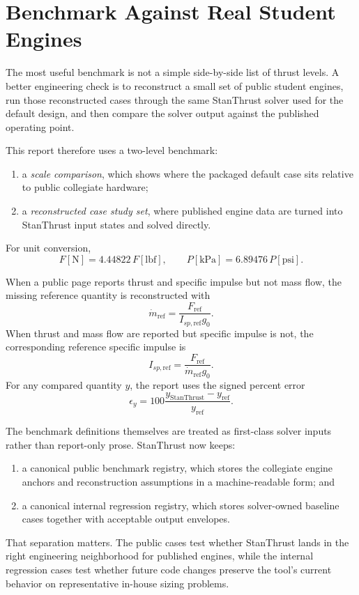\documentclass[11pt]{article}
\begin{document}
\section{Benchmark Against Real Student Engines}
The most useful benchmark is not a simple side-by-side list of thrust levels. A better engineering check is to reconstruct a small set of public student engines, run those reconstructed cases through the same StanThrust solver used for the default design, and then compare the solver output against the published operating point.

This report therefore uses a two-level benchmark:
\begin{enumerate}[leftmargin=6mm]
\item a \emph{scale comparison}, which shows where the packaged default case sits relative to public collegiate hardware;
\item a \emph{reconstructed case study set}, where published engine data are turned into StanThrust input states and solved directly.
\end{enumerate}

For unit conversion,
\begin{equation}
F[\mathrm{N}] = 4.44822\,F[\mathrm{lbf}],
\qquad
P[\mathrm{kPa}] = 6.89476\,P[\mathrm{psi}].
\label{eq:unit-conv}
\end{equation}

When a public page reports thrust and specific impulse but not mass flow, the missing reference quantity is reconstructed with
\begin{equation}
\dot{m}_{\mathrm{ref}} = \frac{F_{\mathrm{ref}}}{I_{sp,\mathrm{ref}} g_0}.
\label{eq:benchmark-mdot}
\end{equation}
When thrust and mass flow are reported but specific impulse is not, the corresponding reference specific impulse is
\begin{equation}
I_{sp,\mathrm{ref}} = \frac{F_{\mathrm{ref}}}{\dot{m}_{\mathrm{ref}} g_0}.
\label{eq:benchmark-isp}
\end{equation}
For any compared quantity $y$, the report uses the signed percent error
\begin{equation}
\epsilon_y = 100\frac{y_{\mathrm{StanThrust}} - y_{\mathrm{ref}}}{y_{\mathrm{ref}}}.
\label{eq:benchmark-error}
\end{equation}

The benchmark definitions themselves are treated as first-class solver inputs rather than report-only prose. StanThrust now keeps:
\begin{enumerate}[leftmargin=6mm]
\item a canonical public benchmark registry, which stores the collegiate engine anchors and reconstruction assumptions in a machine-readable form; and
\item a canonical internal regression registry, which stores solver-owned baseline cases together with acceptable output envelopes.
\end{enumerate}
That separation matters. The public cases test whether StanThrust lands in the right engineering neighborhood for published engines, while the internal regression cases test whether future code changes preserve the tool's current behavior on representative in-house sizing problems.
\end{document}
